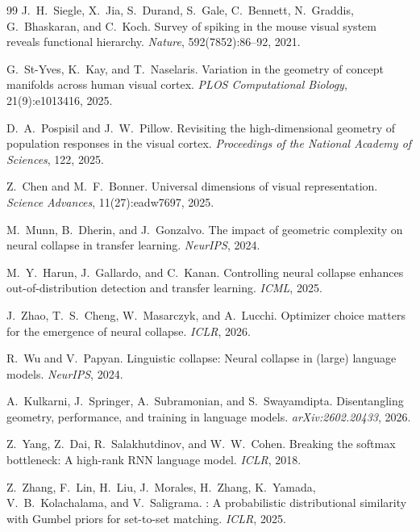 \documentclass{article}
\begin{document}
\begin{thebibliography}{99}
J.~H.~Siegle, X.~Jia, S.~Durand, S.~Gale, C.~Bennett, N.~Graddis, G.~Bhaskaran, and C.~Koch.
\newblock Survey of spiking in the mouse visual system reveals functional hierarchy.
\newblock \emph{Nature}, 592(7852):86--92, 2021.

G.~St-Yves, K.~Kay, and T.~Naselaris.
\newblock Variation in the geometry of concept manifolds across human visual cortex.
\newblock \emph{PLOS Computational Biology}, 21(9):e1013416, 2025.

D.~A.~Pospisil and J.~W.~Pillow.
\newblock Revisiting the high-dimensional geometry of population responses in the visual cortex.
\newblock \emph{Proceedings of the National Academy of Sciences}, 122, 2025.

Z.~Chen and M.~F.~Bonner.
\newblock Universal dimensions of visual representation.
\newblock \emph{Science Advances}, 11(27):eadw7697, 2025.

M.~Munn, B.~Dherin, and J.~Gonzalvo.
\newblock The impact of geometric complexity on neural collapse in transfer learning.
\newblock \emph{NeurIPS}, 2024.

M.~Y.~Harun, J.~Gallardo, and C.~Kanan.
\newblock Controlling neural collapse enhances out-of-distribution detection and transfer learning.
\newblock \emph{ICML}, 2025.

J.~Zhao, T.~S.~Cheng, W.~Masarczyk, and A.~Lucchi.
\newblock Optimizer choice matters for the emergence of neural collapse.
\newblock \emph{ICLR}, 2026.

R.~Wu and V.~Papyan.
\newblock Linguistic collapse: Neural collapse in (large) language models.
\newblock \emph{NeurIPS}, 2024.

A.~Kulkarni, J.~Springer, A.~Subramonian, and S.~Swayamdipta.
\newblock Disentangling geometry, performance, and training in language models.
\newblock \emph{arXiv:2602.20433}, 2026.

Z.~Yang, Z.~Dai, R.~Salakhutdinov, and W.~W.~Cohen.
\newblock Breaking the softmax bottleneck: A high-rank {RNN} language model.
\newblock \emph{ICLR}, 2018.

Z.~Zhang, F.~Lin, H.~Liu, J.~Morales, H.~Zhang, K.~Yamada, V.~B.~Kolachalama, and V.~Saligrama.
: A probabilistic distributional similarity with {G}umbel priors for set-to-set matching.
\newblock \emph{ICLR}, 2025.


\end{thebibliography}
\end{document}
